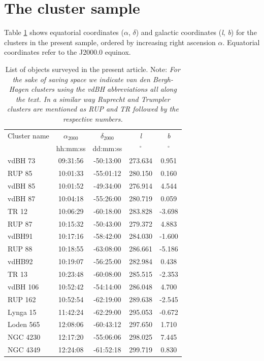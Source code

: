 \documentclass[draft]{aa}
\begin{document}
\section{The cluster sample}
\label{sec:clust_sample}

Table \ref{tab:clust_list} shows equatorial coordinates ($\alpha$, $\delta$) and
galactic coordinates (\textit{l}, \textit{b}) for the clusters in the present
sample, ordered by increasing right ascension $\alpha$. Equatorial coordinates
refer to the J2000.0 equinox.

\begin{table}[ht]
    \centering
    \begin{tabular}{lcccc}
    \hline 
        Cluster name & $\alpha_{2000}$ & $\delta_{2000}$ & \emph{l} & \emph{b}\\
         & hh:mm:ss & dd:mm:ss & $^\circ$ & $^\circ$\\
       \hline \hline 
        vdBH 73 & 09:31:56 & -50:13:00 & 273.634 & 0.951\\
        RUP 85 & 10:01:33 & -55:01:12 &280.150 & 0.160\\
        vdBH 85 & 10:01:52 & -49:34:00 & 276.914 & 4.544\\
        vdBH 87 & 10:04:18 & -55:26:00 & 280.719 & 0.059\\
        TR 12 & 10:06:29 & -60:18:00 & 283.828 & -3.698\\
        RUP 87 & 10:15:32 & -50:43:00 & 279.372 & 4.883\\
        vdBH91 & 10:17:16 & -58:42:00 & 284.030 & -1.600\\
        RUP 88 & 10:18:55 & -63:08:00 & 286.661 & -5.186\\
        vdHB92 & 10:19:07 & -56:25:00 & 282.984 & 0.438\\
        TR 13 & 10:23:48 & -60:08:00 & 285.515 & -2.353\\
        vdBH 106 & 10:52:42 & -54:14:00 & 286.048 & 4.700\\
        RUP 162 & 10:52:54 & -62:19:00 & 289.638 & -2.545\\
        Lynga 15 & 11:42:24 & -62:29:00 & 295.053 & -0.672\\
        Loden 565 & 12:08:06 & -60:43:12 & 297.650 & 1.710\\
        NGC 4230 & 12:17:20 & -55:06:06 & 298.025 & 7.445\\
        NGC 4349 & 12:24:08 & -61:52:18 & 299.719 & 0.830\\
        \hline
    \end{tabular}
    \caption{List of objects surveyed in the present article.
    Note: \textit{For the sake of saving space we indicate van den Bergh-Hagen
    clusters using the vdBH abbreviations all along the text. In a similar
    way Ruprecht and Trumpler clusters are mentioned as RUP and TR followed
    by the respective numbers.}}
    \label{tab:clust_list}
\end{table}
\end{document}

